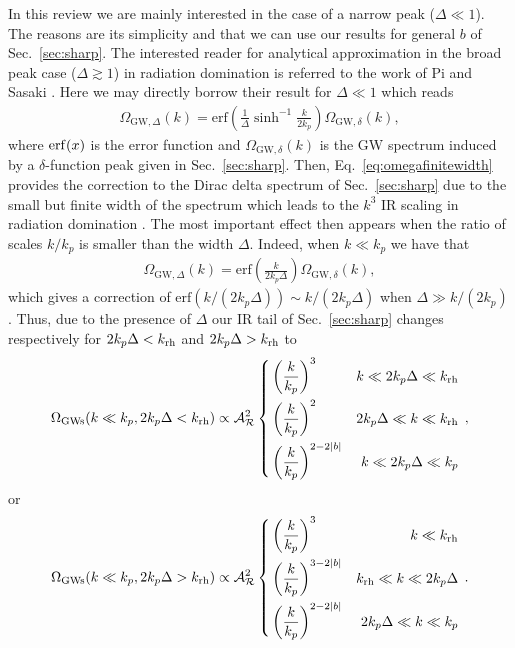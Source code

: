 \documentclass[a4paper,11pt]{article}
\numberwithin{equation}{section}
\begin{document}
In this review we are mainly interested in the case of a narrow peak ($\Delta\ll1$). The reasons are its simplicity and that we can use our results for general $b$ of Sec.~\ref{sec:sharp}. The interested reader for analytical approximation in the broad peak case ($\Delta\gtrsim1$) in radiation domination is referred to the work of Pi and Sasaki \cite{Pi:2020otn}. Here we may directly borrow their result for $\Delta\ll 1$ which reads
\begin{align}\label{eq:omegafinitewidth}
\Omega_{\text{GW},\Delta}(k)=\text{erf}\left(\frac{1}{\Delta}\sinh^{-1}\frac{k}{2k_p}\right)
\Omega_{\text{GW},\delta}(k),
\end{align}
where ${\rm erf}(x)$ is the error function and $\Omega_{\text{GW},\delta}(k)$ is the GW spectrum induced by a $\delta$-function peak given in Sec.~\ref{sec:sharp}. Then, Eq.~\eqref{eq:omegafinitewidth} provides the correction to the Dirac delta spectrum of Sec.~\ref{sec:sharp} due to the small but finite width of the spectrum which leads to the $k^3$ IR scaling in radiation domination \cite{Cai:2019cdl}. The most important effect then appears when the ratio of scales $k/k_p$ is smaller than the width $\Delta$. Indeed, when $k\ll k_p$ we have that
\begin{align}\label{eq:omegafinitewidth2}
\Omega_{\text{GW},\Delta}(k)=\text{erf}\left(\frac{k}{2k_p\Delta}\right)
\Omega_{\text{GW},\delta}(k),
\end{align}
which gives a correction of $\text{erf}\left({k}/({2k_p\Delta})\right)\sim {k}/({2k_p\Delta})$ when $\Delta\gg{k}/({2k_p})$. Thus, due to the presence of $\Delta$ our IR tail of Sec.~\ref{sec:sharp} changes respectively for ${2 k_p \Delta}< k_{\rm rh}$ and ${2 k_p \Delta}>k_{\rm rh}$ to
\begin{align}\label{eq:OMGWRbroad}
\Omega_{\rm GWs}(k\ll k_p,{2 k_p \Delta}< k_{\rm rh})\propto{\cal A}^2_{\cal R}\left\{
\begin{aligned}
&\left(\frac{k}{k_p}\right)^3&k\ll {2 k_p \Delta} \ll k_{\rm rh}\\
&\left(\frac{k}{k_p}\right)^{2}& {2 k_p \Delta}\ll k \ll k_{\rm rh}\\
&\left(\frac{k}{k_p}\right)^{2-2|b|}& k\ll {2 k_p\Delta}\ll k_p
\end{aligned}
\right.\,,
\end{align}
or
\begin{align}\label{eq:OMGWRbroad2}
\Omega_{\rm GWs}(k\ll k_p,{2 k_p \Delta}>k_{\rm rh})\propto{\cal A}^2_{\cal R}\left\{
\begin{aligned}
&\left(\frac{k}{k_p}\right)^3&k\ll k_{\rm rh}\\
&\left(\frac{k}{k_p}\right)^{3-2|b|}& k_{\rm rh}\ll k\ll {2 k_p\Delta}\\
&\left(\frac{k}{k_p}\right)^{2-2|b|}& {2k_p\Delta}\ll k\ll k_p
\end{aligned}
\right.\,.
\end{align}
\end{document}
